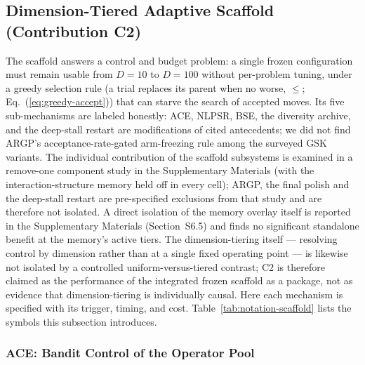 \subsection{Dimension-Tiered Adaptive Scaffold (Contribution C2)}\label{sec:alg:scaffold}

The scaffold answers a control and budget problem: a single frozen
configuration must remain usable from $D=10$ to $D=100$ without
per-problem tuning, under a greedy selection rule (a trial replaces its
parent when no worse, $\le$; Eq.~(\ref{eq:greedy-accept})) that can
starve the search of accepted moves.
Its five sub-mechanisms are labeled honestly: ACE, NLPSR, BSE, the
diversity archive, and the deep-stall restart are modifications of cited
antecedents; we did not find ARGP's acceptance-rate-gated arm-freezing
rule among the surveyed GSK variants.
The individual contribution of the scaffold subsystems is examined in a
remove-one component study in the Supplementary Materials (with
the interaction-structure memory held off in every cell); ARGP, the final
polish and the deep-stall restart are pre-specified exclusions from that study
and are therefore not isolated. A direct isolation
of the memory overlay itself is reported in the Supplementary Materials
(Section~S6.5) and finds no significant standalone benefit at the
memory's active tiers. The dimension-tiering itself --- resolving control
by dimension rather than at a single fixed operating point --- is likewise
not isolated by a controlled uniform-versus-tiered contrast; C2 is therefore
claimed as the performance of the integrated frozen scaffold as a package,
not as evidence that dimension-tiering is individually causal. Here each
mechanism is specified with its trigger,
timing, and cost. Table~\ref{tab:notation-scaffold} lists the symbols this
subsection introduces.



\subsubsection{ACE: Bandit Control of the Operator Pool}\label{sec:alg:ace}

